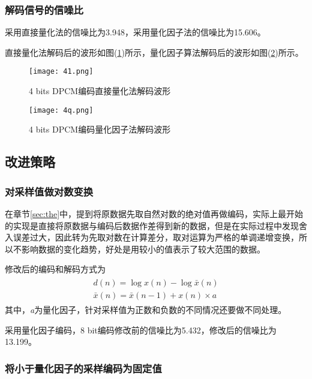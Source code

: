 \documentclass{hitreport}
\begin{document}
\subsubsection{解码信号的信噪比}

采用直接量化法的信噪比为3.948，采用量化因子法的信噪比为15.606。

直接量化法解码后的波形如图(\ref{fig:41})所示，量化因子算法解码后的波形如图(\ref{fig:4q})所示。

\begin{figure}[htb]
	\centering
	\texttt{[image: 41.png]}
	\caption{4 bits DPCM编码直接量化法解码波形}\label{fig:41}
\end{figure}

\begin{figure}[htb]
	\centering
	\texttt{[image: 4q.png]}
	\caption{4 bits DPCM编码量化因子法解码波形}\label{fig:4q}
\end{figure}


\subsection{改进策略}\label{sec:sec3}

\subsubsection{对采样值做对数变换}

在章节\ref{sec:the}中，提到将原数据先取自然对数的绝对值再做编码，实际上最开始的实现是直接将原数据与编码后数据作差得到新的数据，但是在实际过程中发现舍入误差过大，因此转为先取对数在计算差分，取对运算为严格的单调递增变换，所以不影响数据的变化趋势，好处是用较小的值表示了较大范围的数据。

修改后的编码和解码方式为
\begin{align}
\begin{split}
d\left(n\right) = \log x\left(n\right) - \log \bar{x}\left(n\right)\\
\bar{x}\left(n\right) = \bar{x}\left(n-1\right) + x\left(n\right)\times a
\end{split}
\end{align}
其中，\textit{a}为量化因子，针对采样值为正数和负数的不同情况还要做不同处理。

采用量化因子编码，8 bit编码修改前的信噪比为5.432，修改后的信噪比为13.199。

\subsubsection{将小于量化因子的采样编码为固定值}
\end{document}

